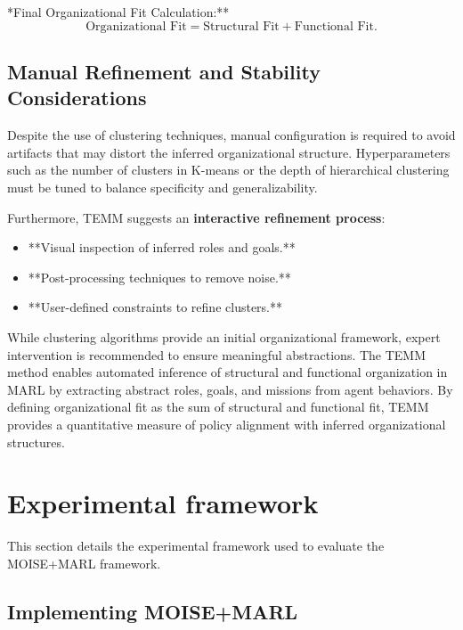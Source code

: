 \documentclass[conference]{IEEEtran}
\begin{document}
\noindent **Final Organizational Fit Calculation:**  
\begin{equation}
    \text{Organizational Fit} = \text{Structural Fit} + \text{Functional Fit}.
\end{equation}

\subsection{Manual Refinement and Stability Considerations}

Despite the use of clustering techniques, manual configuration is required to avoid artifacts that may distort the inferred organizational structure. Hyperparameters such as the number of clusters in K-means or the depth of hierarchical clustering must be tuned to balance specificity and generalizability.

Furthermore, TEMM suggests an \textbf{interactive refinement process}:
\begin{itemize}
    \item **Visual inspection of inferred roles and goals.**
    \item **Post-processing techniques to remove noise.**
    \item **User-defined constraints to refine clusters.**
\end{itemize}

While clustering algorithms provide an initial organizational framework, expert intervention is recommended to ensure meaningful abstractions. The TEMM method enables automated inference of structural and functional organization in MARL by extracting abstract roles, goals, and missions from agent behaviors. By defining organizational fit as the sum of structural and functional fit, TEMM provides a quantitative measure of policy alignment with inferred organizational structures.

\section{Experimental framework}
\label{sec:experimental_setup}

This section details the experimental framework used to evaluate the MOISE+MARL framework.%

\subsection{Implementing MOISE+MARL}
\end{document}
